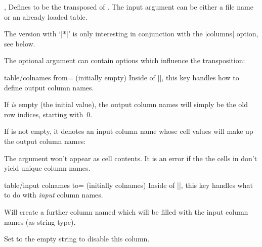 \begin{commandlist}{%
	\pgfplotstabletranspose{},%
	\pgfplotstabletranspose*{}}%
	Defines  to be the transposed of . The input argument can be either a file name or an already loaded table.

	The version with `|*|' is only interesting in conjunction with the |columns| option, see below.

\begin{codeexample}[]
\end{codeexample}

\begin{codeexample}[]
\pgfplotstabletranspose{}
\table
\end{codeexample}

	The optional argument  can contain options which influence the transposition:
	\begin{pgfplotskey}{table/colnames from= (initially empty)}
		Inside of |\pgfplotstabletranspose|, this key handles how to define output column names.
		
		If  \emph{is} empty (the initial value), the output column names will simply be the old row indices, starting with~$0$.

		If  is not empty, it denotes an input column name whose cell values will make up the output column names:
\begin{codeexample}[]
\pgfplotstabletranspose[colnames from=c]
\table
\end{codeexample}
		The argument  won't appear as cell contents. It is an error if the the cells in  don't yield unique column names.
	\end{pgfplotskey}

	\begin{pgfplotskey}{table/input colnames to= (initially colnames)}
		Inside of |\pgfplotstabletranspose|, this key handles what to do with \emph{input} column names.

		Will create a further column named  which will be filled with the input column names (as string type).
\begin{codeexample}[]
\pgfplotstabletranspose[input colnames to=Input]
\table
\end{codeexample}
		Set  to the empty string to disable this column.
\begin{codeexample}[]
\pgfplotstabletranspose[input colnames to=]
\table
\end{codeexample}
	\end{pgfplotskey}


\end{commandlist}
